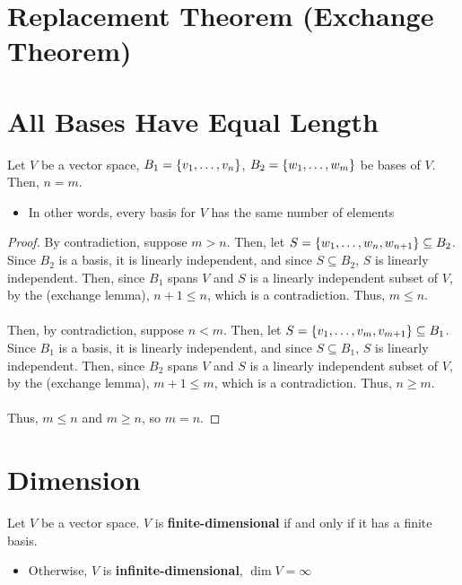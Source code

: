 \documentclass[letterpaper,12pt]{article}
\begin{document}
\section*{Replacement Theorem (Exchange Theorem)}
\begin{theorem}

\end{theorem}

\section*{All Bases Have Equal Length}
\begin{theorem}
Let $V$ be a vector space, $B_1 = \left\{ v_1, \dots, v_n \right\}$, $B_2 = \left\{ w_1, \dots, w_m \right\}$ be bases of $V$. Then, $n = m$.
\begin{itemize}
    \item In other words, every basis for $V$ has the same number of elements
\end{itemize}
\end{theorem}
\begin{proof}
By contradiction, suppose $m > n$. Then, let $S = \left\{ w_1, \dots, w_n, w_{n+1} \right\} \subseteq B_2$. Since $B_2$ is a basis, it is linearly independent, and since $S \subseteq B_2$, $S$ is linearly independent. Then, since $B_1$ spans $V$ and $S$ is a linearly independent subset of $V$, by the (exchange lemma), $n + 1 \leq n$, which is a contradiction. Thus, $m \leq n$.
\\ \\ Then, by contradiction, suppose $n < m$. Then, let $S = \left\{ v_1, \dots, v_m, v_{m+1} \right\} \subseteq B_1$. Since $B_1$ is a basis, it is linearly independent, and since $S \subseteq B_1$, $S$ is linearly independent. Then, since $B_2$ spans $V$ and $S$ is a linearly independent subset of $V$, by the (exchange lemma), $m + 1 \leq m$, which is a contradiction. Thus, $n \geq m$.
\\ \\ Thus, $m \leq n$ and $m \geq n$, so $m = n$.
\end{proof}

\section*{Dimension}
\begin{definition}
Let $V$ be a vector space. $V$ is \textbf{finite-dimensional} if and only if it has a finite basis.
\begin{itemize}
    \item Otherwise, $V$ is \textbf{infinite-dimensional}, $\dim{V} = \infty$
\end{itemize}
\end{definition}
\end{document}
